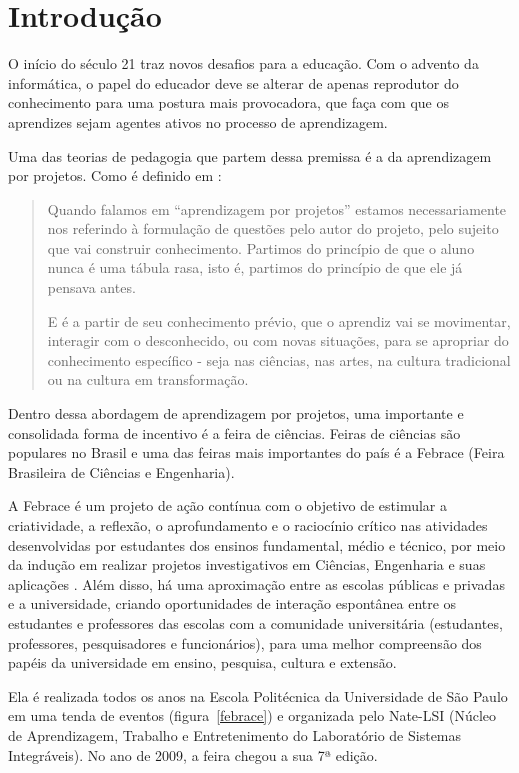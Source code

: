
\chapter{Introdução}

O início do século 21 traz novos desafios para a educação. Com o advento da informática, o papel do educador deve se alterar de apenas reprodutor do conhecimento para uma postura mais provocadora, que faça com que os aprendizes sejam agentes ativos no processo de aprendizagem. 

Uma das teorias de pedagogia que partem dessa premissa é a da aprendizagem por projetos. Como é definido em :

\begin{quotation}
    Quando falamos em “aprendizagem por projetos” estamos necessariamente nos referindo à formulação de questões pelo autor do projeto, pelo sujeito que vai construir conhecimento. Partimos do princípio de que o aluno nunca é uma tábula rasa, isto é, partimos do princípio de que ele já pensava antes.

    E é a partir de seu conhecimento prévio, que o aprendiz vai se movimentar, interagir com o desconhecido, ou com novas situações, para se apropriar do conhecimento específico - seja nas ciências, nas artes, na cultura tradicional ou na cultura em transformação.
\end{quotation}

Dentro dessa abordagem de aprendizagem por projetos, uma importante e consolidada forma de incentivo é a feira de ciências. Feiras de ciências são populares no Brasil e uma das feiras mais importantes do país é a Febrace (Feira Brasileira de Ciências e Engenharia).

A Febrace é um projeto de ação contínua com o objetivo de estimular a criatividade, a reflexão, o aprofundamento e o raciocínio crítico nas atividades desenvolvidas por estudantes dos ensinos fundamental, médio e técnico, por meio da indução em realizar projetos investigativos em Ciências, Engenharia e suas aplicações \cite{lopes07}. Além disso, há uma aproximação entre as escolas públicas e privadas e a universidade, criando oportunidades de interação espontânea entre os estudantes e professores das escolas com a comunidade universitária (estudantes, professores, pesquisadores e funcionários), para uma melhor compreensão dos papéis da universidade em ensino, pesquisa, cultura e extensão. 

Ela é realizada todos os anos na Escola Politécnica da Universidade de São Paulo em uma tenda de eventos (figura~\ref{febrace}) e organizada pelo Nate-LSI (Núcleo de Aprendizagem, Trabalho e Entretenimento do Laboratório de Sistemas Integráveis). No ano de 2009, a feira chegou a sua 7ª edição.

